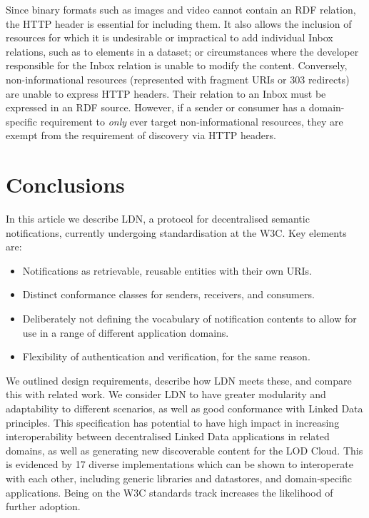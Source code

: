\documentclass[a4paper]{llncs}
\begin{document}
\par Since binary formats such as images and video cannot contain an RDF relation, the HTTP header is essential for including them. It also allows the inclusion of resources for which it is undesirable or impractical to add individual Inbox relations, such as to elements in a dataset; or circumstances where the developer responsible for the Inbox relation is unable to modify the content. Conversely, non-informational resources (represented with fragment URIs or 303 redirects) are unable to express HTTP headers. Their relation to an Inbox must be expressed in an RDF source. However, if a sender or consumer has a domain-specific requirement to {\em only} ever target non-informational resources, they are exempt from the requirement of discovery via HTTP headers.






                        \section{Conclusions}
  \label{conclusions}



\par In this article we describe LDN, a protocol for decentralised semantic notifications, currently undergoing standardisation at the W3C. Key elements are:

                            \begin{itemize}
  \item Notifications as retrievable, reusable entities with their own URIs.\item Distinct conformance classes for senders, receivers, and consumers.\item Deliberately not defining the vocabulary of notification contents to allow for use in a range of different application domains.\item Flexibility of authentication and verification, for the same reason.
    \end{itemize}



\par We outlined design requirements, describe how LDN meets these, and compare this with related work. We consider LDN to have greater modularity and adaptability to different scenarios, as well as good conformance with Linked Data principles. This specification has potential to have high impact in increasing interoperability between decentralised Linked Data applications in related domains, as well as generating new discoverable content for the LOD Cloud. This is evidenced by 17 diverse implementations which can be shown to interoperate with each other, including generic libraries and datastores, and domain-specific applications. Being on the W3C standards track increases the likelihood of further adoption.
\end{document}
